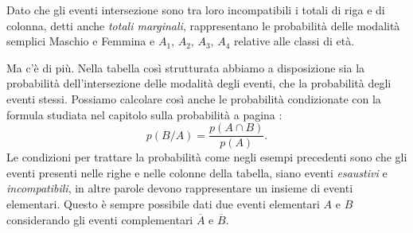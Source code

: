 Dato che gli
eventi intersezione sono tra loro incompatibili i totali di riga e di
colonna, detti anche \emph{totali marginali}, rappresentano le probabilità delle
modalità semplici Maschio e Femmina e  $ A_1 $, $ A_2 $, $ A_3 $, $ A_4 $ relative alle
classi di età.

Ma c'è di più. Nella tabella così strutturata abbiamo a
disposizione sia la probabilità dell'intersezione
delle modalità degli eventi, che la probabilità degli eventi stessi.
Possiamo calcolare così anche le probabilità condizionate con la formula studiata nel capitolo sulla probabilità a pagina \pageref{pr_cond}:
\begin{equation}
\label{eqn:bayes}
p(B/A)=\frac{p(A\cap B)}{p(A)}.
\end{equation}
Le condizioni per trattare la probabilità come negli esempi precedenti
sono che gli eventi presenti nelle righe e nelle colonne della tabella,
siano eventi \emph{esaustivi} e \emph{incompatibili}, in altre parole devono
rappresentare un insieme di eventi elementari. Questo è sempre
possibile dati due eventi elementari  $A$  e  $B$  considerando gli
eventi complementari  $\overline{{A}}$  e  $\overline{{B}}$.

